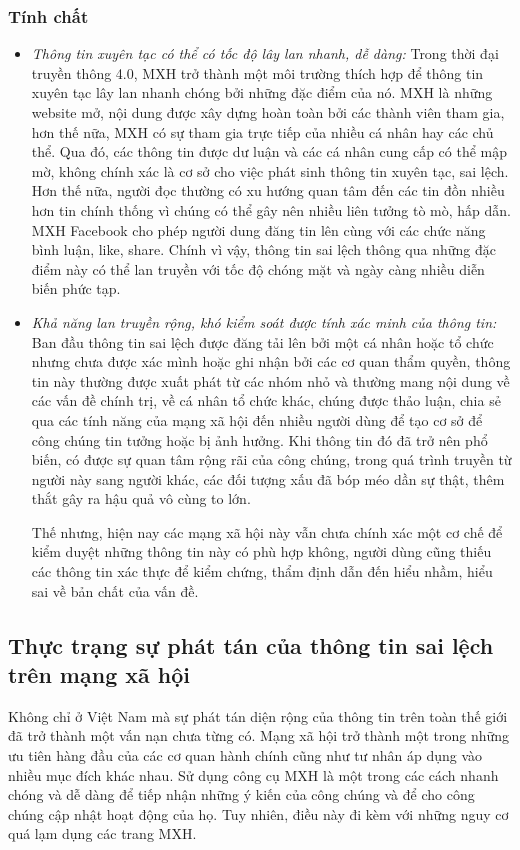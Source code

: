 		\subsubsection{Tính chất}
		\begin {itemize}
			\item {\itshape Thông tin xuyên tạc có thể có tốc độ lây lan nhanh, dễ dàng: }Trong thời đại truyền thông 4.0, MXH trở thành một môi trường thích hợp để thông tin xuyên tạc lây lan nhanh chóng bởi những đặc điểm của nó. MXH là những website mở, nội dung được xây dựng hoàn toàn bởi các thành viên tham gia, hơn thế nữa, MXH có sự tham gia trực tiếp của nhiều cá nhân hay các chủ thể. Qua đó, các thông tin được dư luận và các cá nhân cung cấp có thể mập mờ, không chính xác là cơ sở cho việc phát sinh thông tin xuyên tạc, sai lệch. Hơn thế nữa, người đọc thường có xu hướng quan tâm đến các tin đồn nhiều hơn tin chính thống vì chúng có thể gây nên nhiều liên tưởng tò mò, hấp dẫn. MXH Facebook cho phép người dung đăng tin lên cùng với các chức năng bình luận, like, share. Chính vì vậy, thông tin sai lệch thông qua những đặc điểm này có thể lan truyền với tốc độ chóng mặt và ngày càng nhiều diễn biến phức tạp.
		
			\item {\itshape Khả năng lan truyền rộng, khó kiểm soát được tính xác minh của thông tin: }Ban đầu thông tin sai lệch được đăng tải lên bởi một cá nhân hoặc tổ chức nhưng chưa được xác mình hoặc ghi nhận bởi các cơ quan thẩm quyền, thông tin này thường được xuất phát từ các nhóm nhỏ và thường mang nội dung về các vấn đề chính trị, về cá nhân tổ chức khác, chúng được thảo luận, chia sẻ qua các tính năng của mạng xã hội đến nhiều người dùng để tạo cơ sở để công chúng tin tưởng hoặc bị ảnh hưởng. Khi thông tin đó đã trở nên phổ biến, có được sự quan tâm rộng rãi của công chúng, trong quá trình truyền từ người này sang người khác, các đối tượng xấu đã bóp méo dần sự thật, thêm thắt gây ra hậu quả vô cùng to lớn.
		
		Thế nhưng, hiện nay các mạng xã hội này vẫn chưa chính xác một cơ chế để kiểm duyệt những thông tin này có phù hợp không, người dùng cũng thiếu các thông tin xác thực để kiểm chứng, thẩm định dẫn đến hiểu nhầm, hiểu sai về bản chất của vấn đề.
		\end {itemize}
	\subsection{Thực trạng sự phát tán của thông tin sai lệch trên mạng xã hội }
	Không chỉ ở Việt Nam mà sự phát tán diện rộng của thông tin trên toàn thế giới đã trở thành một vấn nạn chưa từng có. Mạng xã hội trở thành một trong những ưu tiên hàng đầu của các cơ quan hành chính cũng như tư nhân áp dụng vào nhiều mục đích khác nhau. Sử dụng công cụ MXH là một trong các cách nhanh chóng và dễ dàng để tiếp nhận những ý kiến của công chúng và để cho công chúng cập nhật hoạt động của họ. Tuy nhiên, điều này đi kèm với những nguy cơ quá lạm dụng các trang MXH.
	

